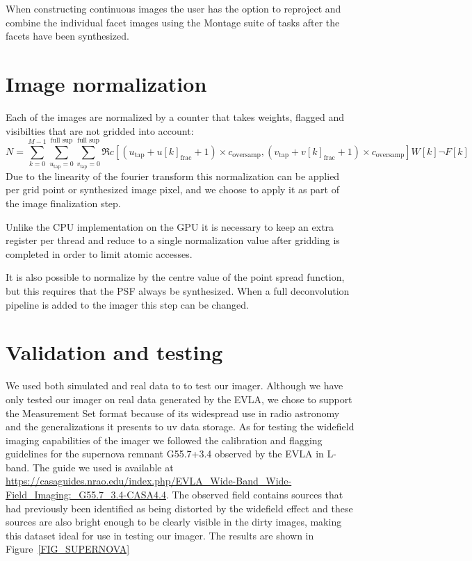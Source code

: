 When constructing continuous images the user has the option to reproject and combine the individual facet images using the Montage \cite{jacob2004montage} suite of tasks after the facets have been
synthesized.

\section{Image normalization}
Each of the images are normalized by a counter that takes weights, flagged and visibilties that are not gridded into account:
\begin{equation}
 N = \sum_{k=0}^{M-1}{\sum_{u_\text{tap}=0}^{\text{full sup}}{\sum_{v_\text{tap}=0}^{\text{full sup}}{\Re{c[(u_\text{tap}+u[k]_\text{frac} + 1)\times c_\text{oversamp},(v_\text{tap}+v[k]_\text{frac} + 1)\times c_\text{oversamp}]}}} W[k]\neg F[k]}
\end{equation}
Due to the linearity of the fourier transform this normalization can be applied per grid point or synthesized image pixel, and we choose to apply it as part of the image finalization step. 

Unlike the CPU implementation on the GPU it is necessary to keep an extra register per thread and reduce to a single normalization value after gridding is completed in order to limit atomic accesses.

It is also possible to normalize by the centre value of the point spread function, but this requires that the PSF always be synthesized. When a full deconvolution pipeline is added to the imager this step
can be changed.

\section{Validation and testing}
We used both simulated and real data to to test our imager. Although we have only tested our imager on real data generated
by the EVLA, we chose to support the Measurement Set format because of its widespread use in radio astronomy and the generalizations it presents to
uv data storage.  As for testing the  widefield imaging capabilities of the imager we followed the calibration and flagging guidelines for the supernova 
remnant G55.7+3.4 observed by the EVLA in L-band. The guide we used is available at \url{https://casaguides.nrao.edu/index.php/EVLA_Wide-Band_Wide-Field_Imaging:_G55.7_3.4-CASA4.4}.
The observed field contains sources that had previously been identified as being distorted by the widefield effect and these sources are also bright enough to be clearly visible in 
the dirty images, making this dataset ideal for use in testing our imager. The results are shown in Figure~\ref{FIG_SUPERNOVA}

